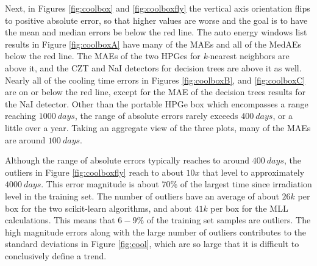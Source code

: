 Next, in Figures \ref{fig:coolbox} and \ref{fig:coolboxfly} the vertical axis
orientation flips to positive absolute error, so that higher values are worse
and the goal is to have the mean and median errors be below the red line.  The
auto energy windows list results in Figure \ref{fig:coolboxA} have many of the
\gls{MAE}s and all of the \gls{MedAE}s below the red line.  The \gls{MAE}s of
the two \gls{HPGe}s for \textit{k}-nearest neighbors are above it, and the
\gls{CZT} and \gls{NaI} detectors for decision trees are above it as well.
Nearly all of the cooling time errors in Figures \ref{fig:coolboxB}, and
\ref{fig:coolboxC} are on or below the red line, except for the \gls{MAE} of
the decision trees results for the \gls{NaI} detector.  Other than the portable
\gls{HPGe} box which encompasses a range reaching $1000\:days$, the range of
absolute errors rarely exceeds $400\:days$, or a little over a year.  Taking an
aggregate view of the three plots, many of the \gls{MAE}s are around
$100\:days$.

Although the range of absolute errors typically reaches to around $400\:days$,
the outliers in Figure \ref{fig:coolboxfly} reach to about $10x$ that level to
approximately $4000\:days$. This error magnitude is about 70\% of the largest
time since irradiation level in the training set.  The number of outliers have
an average of about $26k$ per box for the two scikit-learn algorithms, and
about $41k$ per box for the \gls{MLL} calculations.  This means that $6-9\%$ of
the training set samples are outliers.  The high magnitude errors along with
the large number of outliers contributes to the standard deviations in Figure
\ref{fig:cool}, which are so large that it is difficult to conclusively define
a trend.
